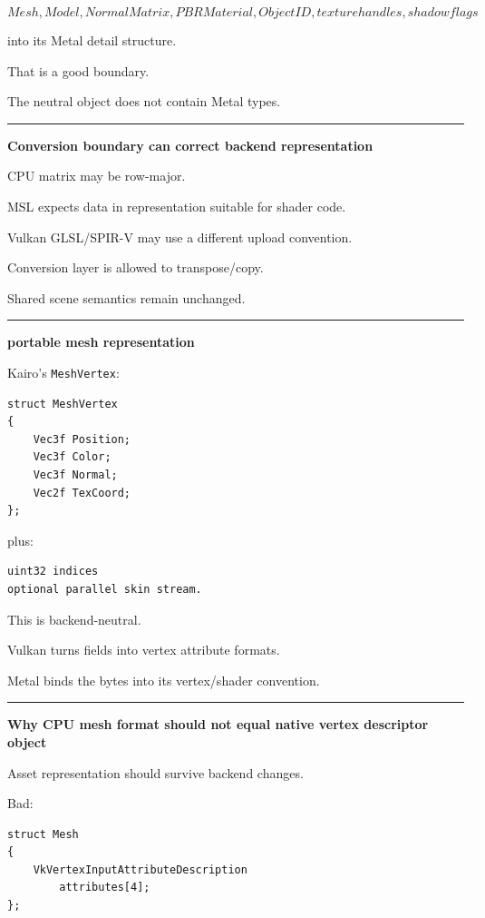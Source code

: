 \[
Mesh,
Model,
NormalMatrix,
PBRMaterial,
ObjectID,
texture handles,
shadow flags
\]

into its Metal detail structure.

That is a good boundary.

The neutral object does not contain Metal types.

\begin{center}\rule{0.5\linewidth}{0.5pt}\end{center}

\textbf{Conversion boundary can correct backend representation}

CPU matrix may be row-major.

MSL expects data in representation suitable for shader code.

Vulkan GLSL/SPIR-V may use a different upload convention.

Conversion layer is allowed to transpose/copy.

Shared scene semantics remain unchanged.

\begin{center}\rule{0.5\linewidth}{0.5pt}\end{center}

\textbf{portable mesh representation}

Kairo's \texttt{MeshVertex}:

\begin{verbatim}
struct MeshVertex
{
    Vec3f Position;
    Vec3f Color;
    Vec3f Normal;
    Vec2f TexCoord;
};
\end{verbatim}

plus:

\begin{verbatim}
uint32 indices
optional parallel skin stream.
\end{verbatim}

This is backend-neutral.

Vulkan turns fields into vertex attribute formats.

Metal binds the bytes into its vertex/shader convention.

\begin{center}\rule{0.5\linewidth}{0.5pt}\end{center}

\textbf{Why CPU mesh format should not equal native vertex descriptor object}

Asset representation should survive backend changes.

Bad:

\begin{verbatim}
struct Mesh
{
    VkVertexInputAttributeDescription
        attributes[4];
};
\end{verbatim}

